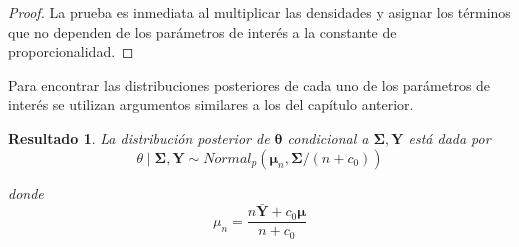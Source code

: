 \documentclass[
  10pt,
  spanish,
]{book}
\newtheorem{proposition}{Resultado}[chapter]
\theoremstyle{definition}
\theoremstyle{definition}
\theoremstyle{definition}
\theoremstyle{definition}
\theoremstyle{remark}
\begin{document}
\begin{proof}
{}La prueba es inmediata al multiplicar las densidades y asignar los términos que no dependen de los parámetros de interés a la constante de proporcionalidad.
\end{proof}

Para encontrar las distribuciones posteriores de cada uno de los parámetros de interés se utilizan argumentos similares a los del capítulo anterior.

\begin{proposition}
\protect\hypertarget{prp:unnamed-chunk-45}{}{\label{prp:unnamed-chunk-45} }La distribución posterior de \(\boldsymbol \theta\) condicional a \(\boldsymbol \Sigma,\mathbf{Y}\) está dada por
\begin{equation*}
\theta \mid \boldsymbol \Sigma,\mathbf{Y} \sim Normal_p(\boldsymbol \mu_n,\boldsymbol \Sigma/(n+c_0))
\end{equation*}

donde
\begin{equation*}
\mu_n=\frac{n\bar{\mathbf{Y}}+c_0\boldsymbol \mu}{n+c_0}
\end{equation*}
\end{proposition}
\end{document}
